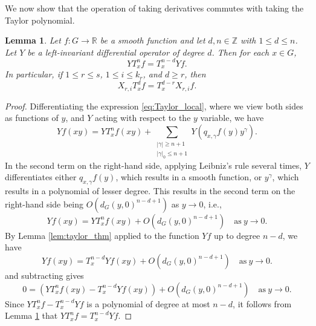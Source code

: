 \documentclass[11pt,reqno]{amsart}
\newtheorem{lemma}[theorem]{Lemma}
\newcommand{\1}{\mathbf 1}
\begin{document}
We now show that the operation of taking derivatives commutes with taking the Taylor polynomial.
\begin{lemma}\label{lem:taylor_unique}
    Let $f:G\to \mathbb{R}$ be a smooth function and let $d,n\in \mathbb{Z}$ with $1\le d\le n$. Let $Y$ be a left-invariant differential operator of degree $d$. Then for each $x\in G$,
    \[
    YT^n_xf =T^{n-d}_x Yf. 
    \]
    In particular, if $1\le r \le s$, $1\le i\le k_r$, and $d\ge r$, then
    \[
    X_{r,i}T^d_xf=T^{d-r}_x X_{r,i}f.
    \]
\end{lemma}
\begin{proof}
    Differentiating the expression \eqref{eq:Taylor_local}, where we view both sides as functions of $y$, and $Y$ acting with respect to the $y$ variable, we have
    \[
    Yf\left(xy\right)=YT^n_xf\left(xy\right)+\sum_{\substack{\left|\gamma\right|\ge n+1 \\ \left|\gamma\right|_0\le n+1}}Y\left(q_{x,\gamma}f\left(y\right)y^\gamma\right).
    \]
    In the second term on the right-hand side, applying Leibniz's rule several times, $Y$ differentiates either $q_{x,\gamma}f\left(y\right)$, which results in a smooth function, or $y^\gamma$, which results in a polynomial of lesser degree. This results in the second term on the right-hand side being $O\left(d_G\left(y,0\right)^{n-d+1}\right)$ as $y\to 0$, i.e.,
    \[
    Yf\left(xy\right)=YT^n_xf\left(xy\right)+O\left(d_G\left(y,0\right)^{n-d+1}\right)\quad\mathrm{as~}y\to 0.
    \]
    By Lemma \ref{lem:taylor_thm} applied to the function $Yf$ up to degree $n-d$, we have
    \[
    Yf\left(xy\right)=T^{n-d}_x Yf\left(xy\right)+O\left(d_G\left(y,0\right)^{n-d+1}\right)\quad\mathrm{as~}y\to 0.
    \]
    and subtracting gives
    \[
    0=\left(YT^n_xf\left(xy\right)-T^{n-d}_x Yf\left(xy\right)\right)+O\left(d_G\left(y,0\right)^{n-d+1}\right)\quad\mathrm{as~}y\to 0.
    \]
    Since $YT^n_xf-T^{n-d}_xYf$ is a polynomial of degree at most $n-d$, it follows from Lemma \ref{lem:taylor_unique} that $YT^n_xf=T^{n-d}_xYf$.
\end{proof}
\end{document}
